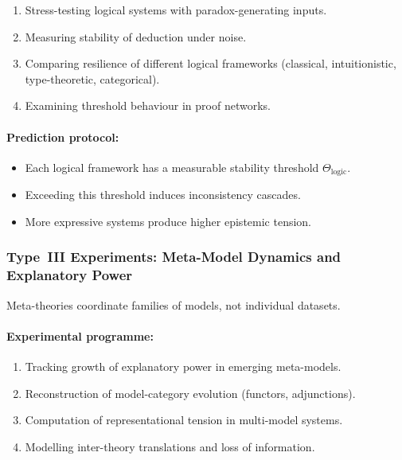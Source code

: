 \begin{enumerate}
    \item Stress-testing logical systems with paradox-generating inputs.
    \item Measuring stability of deduction under noise.
    \item Comparing resilience of different logical frameworks
          (classical, intuitionistic, type-theoretic, categorical).
    \item Examining threshold behaviour in proof networks.
\end{enumerate}

\paragraph{Prediction protocol:}

\begin{itemize}
    \item Each logical framework has a measurable stability threshold
          $\Theta_{\mathrm{logic}}$.
    \item Exceeding this threshold induces inconsistency cascades.
    \item More expressive systems produce higher epistemic tension.
\end{itemize}



\subsubsection{Type~III Experiments: Meta-Model Dynamics and Explanatory Power}

Meta-theories coordinate families of models, not individual datasets.

\paragraph{Experimental programme:}

\begin{enumerate}
    \item Tracking growth of explanatory power in emerging meta-models.
    \item Reconstruction of model-category evolution (functors, adjunctions).
    \item Computation of representational tension in multi-model systems.
    \item Modelling inter-theory translations and loss of information.
\end{enumerate}


